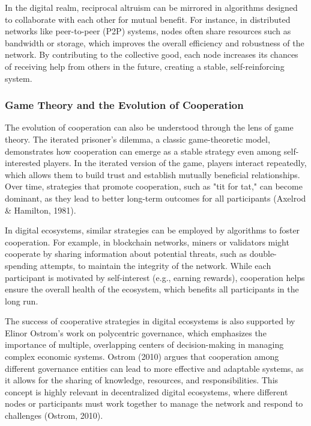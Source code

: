 \documentclass[12pt,twoside]{article}
\begin{document}
In the digital realm, reciprocal altruism can be mirrored in algorithms designed to collaborate with each other for mutual benefit. For instance, in distributed networks like peer-to-peer (P2P) systems, nodes often share resources such as bandwidth or storage, which improves the overall efficiency and robustness of the network. By contributing to the collective good, each node increases its chances of receiving help from others in the future, creating a stable, self-reinforcing system.

\subsubsection{Game Theory and the Evolution of Cooperation}

The evolution of cooperation can also be understood through the lens of game theory. The iterated prisoner’s dilemma, a classic game-theoretic model, demonstrates how cooperation can emerge as a stable strategy even among self-interested players. In the iterated version of the game, players interact repeatedly, which allows them to build trust and establish mutually beneficial relationships. Over time, strategies that promote cooperation, such as "tit for tat," can become dominant, as they lead to better long-term outcomes for all participants (Axelrod & Hamilton, 1981).

In digital ecosystems, similar strategies can be employed by algorithms to foster cooperation. For example, in blockchain networks, miners or validators might cooperate by sharing information about potential threats, such as double-spending attempts, to maintain the integrity of the network. While each participant is motivated by self-interest (e.g., earning rewards), cooperation helps ensure the overall health of the ecosystem, which benefits all participants in the long run.

The success of cooperative strategies in digital ecosystems is also supported by Elinor Ostrom’s work on polycentric governance, which emphasizes the importance of multiple, overlapping centers of decision-making in managing complex economic systems. Ostrom (2010) argues that cooperation among different governance entities can lead to more effective and adaptable systems, as it allows for the sharing of knowledge, resources, and responsibilities. This concept is highly relevant in decentralized digital ecosystems, where different nodes or participants must work together to manage the network and respond to challenges (Ostrom, 2010).
\end{document}
